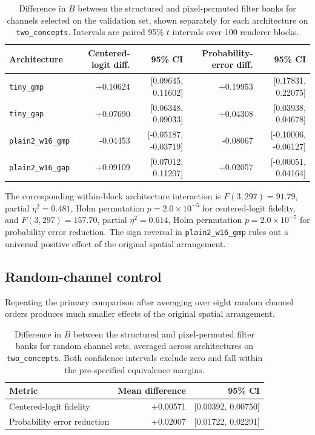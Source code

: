 \begin{table}[h]
\caption{Difference in $B$ between the structured and pixel-permuted filter banks for channels selected on the validation set, shown separately for each architecture on \texttt{two\_concepts}. Intervals are paired 95\% $t$ intervals over 100 renderer blocks.}
\label{tab:anchor-architectures}
\centering
\scriptsize
\setlength{\tabcolsep}{2.5pt}
\begin{tabular}{lrrrr}
\toprule
Architecture & Centered-logit diff. & 95\% CI & Probability-error diff. & 95\% CI \\
\midrule
\texttt{tiny\_gmp} & +0.10624 & [0.09645, 0.11602] & +0.19953 & [0.17831, 0.22075] \\
\texttt{tiny\_gap} & +0.07690 & [0.06348, 0.09033] & +0.04308 & [0.03938, 0.04678] \\
\texttt{plain2\_w16\_gmp} & -0.04453 & [-0.05187, -0.03719] & -0.08067 & [-0.10006, -0.06127] \\
\texttt{plain2\_w16\_gap} & +0.09109 & [0.07012, 0.11207] & +0.02057 & [-0.00051, 0.04164] \\
\bottomrule
\end{tabular}
\end{table}

The corresponding within-block architecture interaction is
$F(3,297)=91.79$, partial $\eta^2=0.481$, Holm permutation $p=2.0\times10^{-5}$ for centered-logit fidelity, and
$F(3,297)=157.70$, partial $\eta^2=0.614$, Holm permutation $p=2.0\times10^{-5}$ for probability error reduction. The sign reversal in \texttt{plain2\_w16\_gmp} rules out a universal positive effect of the original spatial arrangement.

\subsection{Random-channel control}\label{app:anchor-random}

Repeating the primary comparison after averaging over eight random channel orders produces much smaller effects of the original spatial arrangement.

\begin{table}[h]
\caption{Difference in $B$ between the structured and pixel-permuted filter banks for random channel sets, averaged across architectures on \texttt{two\_concepts}. Both confidence intervals exclude zero and fall within the pre-specified equivalence margins.}
\label{tab:anchor-random}
\centering
\small
\begin{tabular}{lrr}
\toprule
Metric & Mean difference & 95\% CI \\
\midrule
Centered-logit fidelity & +0.00571 & [0.00392, 0.00750] \\
Probability error reduction & +0.02007 & [0.01722, 0.02291] \\
\bottomrule
\end{tabular}
\end{table}

